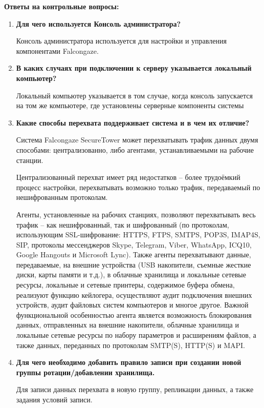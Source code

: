 \documentclass[a4paper,14pt]{extarticle}
\begin{document}
    \textbf{Ответы на контрольные вопросы:}
    \begin{enumerate}
        \item \textbf{Для чего используется Консоль администратора?} \par
        \qquad Консоль администратора используется для настройки и управления
        компонентами Falcongaze.  
        \item \textbf{В каких случаях при подключении к серверу указывается локальный компьютер?} \par
        \qquad Локальный компьютер указывается в том случае, когда консоль запускается на том же 
        компьютере, где установлены серверные компоненты системы
        \item \textbf{Какие способы перехвата поддерживает система и в чем их отличие?}\par
        \qquad Система Falcongaze SecureTower может перехватывать трафик данных двумя способами: централизованно, либо агентами, устанавливаемыми на рабочие станции.\par
        \qquad Централизованный перехват имеет ряд недостатков – более трудоёмкий процесс настройки, перехватывать возможно только трафик, передаваемый по нешифрованным протоколам. \par
        \qquad Агенты, установленные на рабочих станциях, позволяют перехватывать весь трафик – как нешифрованный, так и шифрованный (по протоколам, использующим SSL-шифрование: HTTPS, FTPS, SMTPS, POP3S, IMAP4S, SIP, протоколы мессенджеров Skype, Telegram, Viber, WhatsApp, ICQ10, Google Hangouts и Microsoft Lync). Также агенты перехватывают данные, передаваемые, на внешние устройства (USB накопители, съемные жесткие диски, карты памяти и т.д.), в облачные хранилища и локальные сетевые ресурсы, локальные и сетевые принтеры, содержимое буфера обмена, реализуют функцию кейлогера, осуществляют аудит подключения внешних устройств, аудит файловых систем компьютеров и многое другое. Важной функциональной особенностью агента является возможность блокирования данных, отправленных на внешние накопители, облачные хранилища и локальные сетевые ресурсы по набору параметров и расширениям файлов, а также данных, переданных по протоколам SMTP(S), HTTP(S) и MAPI.
        \item \textbf{Для чего необходимо добавить правило записи при создании новой группы ротации/добавлении хранилища.} \par
        \qquad Для записи данных перехвата в новую группу, репликации данных, а также задания условий записи.

\end{enumerate}
\end{document}
